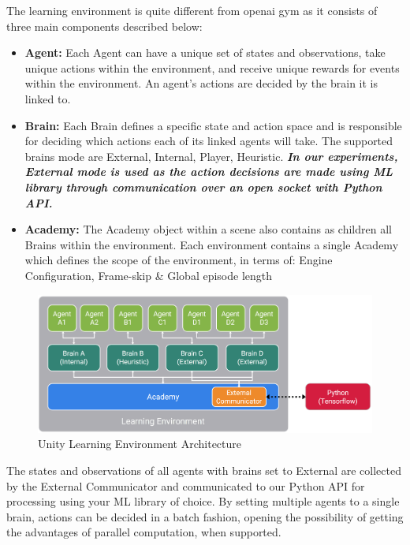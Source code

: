 The learning environment is quite different from openai gym as it consists of three main components described below:

\begin{itemize}
		\item \textbf{Agent:} Each Agent can have a unique set of states and observations, take unique actions within the environment, and receive unique rewards for events within the environment. An agent’s actions are decided by the brain it is linked to.
		\item \textbf{Brain:} Each Brain defines a specific state and action space and is responsible for deciding which actions each of its linked agents will take. The supported brains mode are External, Internal, Player, Heuristic. \textit{\textbf{In our experiments, External mode is used as the action decisions are made using ML library through communication over an open socket with Python API.}}
		\item \textbf{Academy:} The Academy object within a scene also contains as children all Brains within the environment. Each environment contains a single Academy which defines the scope of the environment, in terms of: Engine Configuration, Frame-skip \& Global episode length
\end{itemize}

\begin{figure}[!htb]
		\centering
		\includegraphics[width=\linewidth]{figures/unity_api.png}
		\caption{Unity Learning Environment Architecture}
		\label{fig:unity_api}
\end{figure}

The states and observations of all agents with brains set to External are collected by the External Communicator and communicated to our Python API for processing using your ML library of choice. By setting multiple agents to a single brain, actions can be decided in a batch fashion, opening the possibility of getting the advantages of parallel computation, when supported.

